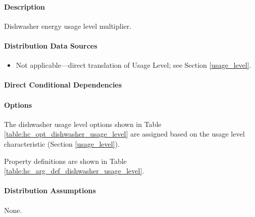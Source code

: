 \paragraph{Description}
% 
Dishwasher energy usage level multiplier.

\paragraph{Distribution Data Sources}
% 
\begin{itemize}
\item 
Not applicable---direct translation of  Usage Level; see Section \ref{usage_level}.
\end{itemize}

\paragraph{Direct Conditional Dependencies}


\paragraph{Options}
The dishwasher usage level options shown in Table \ref{table:hc_opt_dishwasher_usage_level} are assigned based on the usage level characteristic (Section \ref{usage_level}).



Property definitions are shown in Table \ref{table:hc_arg_def_dishwasher_usage_level}.



\paragraph{Distribution Assumptions}
% 
None.
